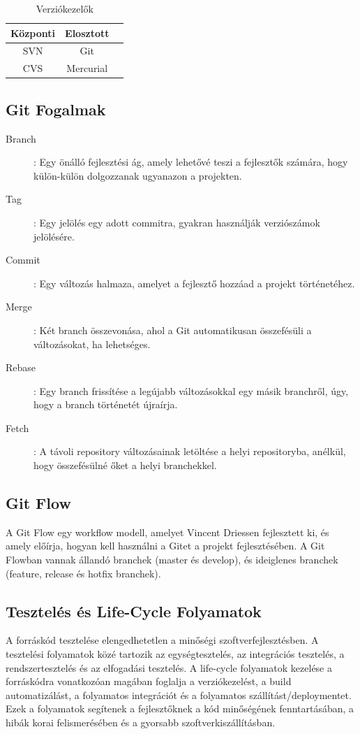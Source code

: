 \documentclass{report}
\begin{document}
				\begin{table}[htbp]
					    \centering
					    \begin{tabular}{|c|c|c|}
					    \hline
					    \textbf{Központi} & \textbf{Elosztott}  \\
					    \hline
					    SVN & Git \\
					    CVS & Mercurial \\
					    \hline
					    \end{tabular}
					    \caption{Verziókezelők}
					    \label{tab:Verziókezelők}
				\end{table}



			\subsection{Git Fogalmak}
				\begin{description}
					\item [Branch]: Egy önálló fejlesztési ág, amely lehetővé teszi a fejlesztők számára, hogy külön-külön dolgozzanak ugyanazon a projekten.
					\item [Tag]: Egy jelölés egy adott commitra, gyakran használják verziószámok jelölésére.
					\item [Commit]: Egy változás halmaza, amelyet a fejlesztő hozzáad a projekt történetéhez.
					\item [Merge]: Két branch összevonása, ahol a Git automatikusan összefésüli a változásokat, ha lehetséges.
					\item [Rebase]: Egy branch frissítése a legújabb változásokkal egy másik branchről, úgy, hogy a branch történetét újraírja.
					\item [Fetch]: A távoli repository változásainak letöltése a helyi repositoryba, anélkül, hogy összefésülné őket a helyi branchekkel.
				\end{description}
			
			\subsection{Git Flow}
				A Git Flow egy workflow modell, amelyet Vincent Driessen fejlesztett ki, és amely előírja, hogyan kell használni a Gitet a projekt fejlesztésében. A Git Flowban vannak állandó branchek (master és develop), és ideiglenes branchek (feature, release és hotfix branchek).
			
			\subsection{Tesztelés és Life-Cycle Folyamatok}
				A forráskód tesztelése elengedhetetlen a minőségi szoftverfejlesztésben. A tesztelési folyamatok közé tartozik az egységtesztelés, az integrációs tesztelés, a rendszertesztelés és az elfogadási tesztelés. A life-cycle folyamatok kezelése a forráskódra vonatkozóan magában foglalja a verziókezelést, a build automatizálást, a folyamatos integrációt és a folyamatos szállítást/deploymentet. Ezek a folyamatok segítenek a fejlesztőknek a kód minőségének fenntartásában, a hibák korai felismerésében és a gyorsabb szoftverkiszállításban.
		
\end{document}
